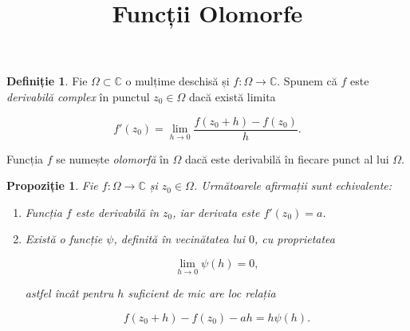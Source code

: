 \documentclass[12pt]{article}
\title{Funcții Olomorfe}
\author{}
\date{}
\theoremstyle{definition}
\newtheorem{definition}{Definiție}
\theoremstyle{plain}
\newtheorem{proposition}{Propoziție}
\begin{document}
\maketitle

\begin{definition}
Fie $\Omega \subset \mathbb{C}$ o mulțime deschisă și $f:\Omega \to \mathbb{C}$. 
Spunem că $f$ este \emph{derivabilă complex} în punctul $z_0 \in \Omega$ dacă există limita


\[
f'(z_0) = \lim_{h \to 0} \frac{f(z_0 + h) - f(z_0)}{h}.
\]


Funcția $f$ se numește \emph{olomorfă} în $\Omega$ dacă este derivabilă în fiecare punct al lui $\Omega$.
\end{definition}

\begin{proposition}
Fie $f:\Omega \to \mathbb{C}$ și $z_0 \in \Omega$. Următoarele afirmații sunt echivalente:
\begin{enumerate}
    \item[(i)] Funcția $f$ este derivabilă în $z_0$, iar derivata este $f'(z_0)=a$.
    \item[(ii)] Există o funcție $\psi$, definită în vecinătatea lui $0$, cu proprietatea
    

\[
    \lim_{h \to 0} \psi(h) = 0,
    \]


    astfel încât pentru $h$ suficient de mic are loc relația
    

\[
    f(z_0 + h) - f(z_0) - a h = h \psi(h).
    \]


\end{enumerate}
\end{proposition}
\end{document}
